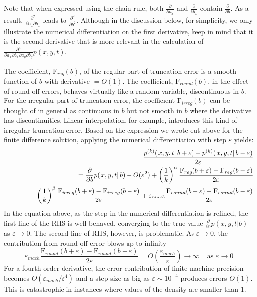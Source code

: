 \documentclass[10pt]{article}
\begin{document}
Note that when expressed using the chain rule, both
$\displaystyle \frac{\partial}{\partial a_x}$ and
$\displaystyle \frac{\partial}{\partial b_x}$ contain
$\displaystyle \frac{\partial}{\partial b}$. As a result,
$\displaystyle \frac{\partial^2 }{\partial a_x \partial b_x} $ leads
to $\displaystyle \frac{\partial^2 }{\partial b^2} $. Although in the
discussion below, for simplicity, we only illustrate the numerical
differentiation on the first derivative, keep in mind that it is the
second derivative that is more relevant in the calculation of
$\displaystyle \frac{\partial^4}{\partial a_x \partial b_x \partial
  a_y \partial b_y} p(x, y, t) $.

The coefficient, $\mbox{F}_{reg}(b) $, of the regular part of
truncation error is a smooth function of $b$ with derivative $= O(1)$.
The coefficient, $\mbox{F}_{round}(b) $, in the effect of round-off
errors, behaves virtually like a random variable, discontinuous in
$b$.  For the irregular part of truncation error, the coefficient
$\mbox{F}_{irreg}(b) $ can be thought of in general as continuous in
$b$ but not smooth in $b$ where the derivative has
discontinuities. Linear interpolation, for example, introduces this
kind of irregular truncation error. Based on the expression we wrote
out above for the finite difference solution, applying the numerical
differentiation with step $\varepsilon$ yields:
\begin{eqnarray}
  & & \frac{p^{(k)}(\left. x, y, t \right| b+\varepsilon)-p^{(k)}(\left. x, y, t \right| b -\varepsilon)}{2 \varepsilon} \nonumber \\
  & & \hspace*{1cm} =  \frac{\partial }{\partial b} p(\left. x, y, t \right| b) + O(\varepsilon^2)
      + \left(\frac{1}{k}\right)^{\alpha} \frac{\mbox{F}_{reg}(b+\varepsilon)-\mbox{F}_{reg}(b-\varepsilon)}{2 \varepsilon}  \nonumber \\
  & & \hspace*{1cm} + \left(\frac{1}{k}\right)^{\beta} \frac{\mbox{F}_{irreg}(b+\varepsilon)-\mbox{F}_{irreg}(b-\varepsilon)}{2 \varepsilon}
      + \varepsilon_{mach} \frac{\mbox{F}_{round}(b+\varepsilon)-\mbox{F}_{round}(b-\varepsilon)}{2 \varepsilon}  \nonumber
\end{eqnarray}
In the equation above, as the step in the numerical differentiation is
refined, the first line of the RHS is well behaved, converging to the
true value $\frac{\partial }{\partial b} p(\left. x, y, t \right| b)$
as $\varepsilon \rightarrow 0$.  The second line of RHS, however, is
problematic. As $\varepsilon \rightarrow 0$, the contribution from
round-off error blows up to infinity
\[
  \varepsilon_{mach}
  \frac{\mbox{F}_{round}(b+\varepsilon)-\mbox{F}_{round}(b-\varepsilon)}{2
    \varepsilon} = O\left(\frac{\varepsilon_{mach}}{\varepsilon}
  \right) \longrightarrow \infty \;\;\;\; \mbox{as } \varepsilon
  \rightarrow 0
\]
For a fourth-order derivative, the error
contribution of finite machine precision becomes
$O(\varepsilon_{mach}/\varepsilon^4)$ and a step size as big as
$\varepsilon \sim 10^{-4}$ produces errors $O(1)$. This is
catastrophic in instances where values of the density are smaller than 1.
\end{document}
